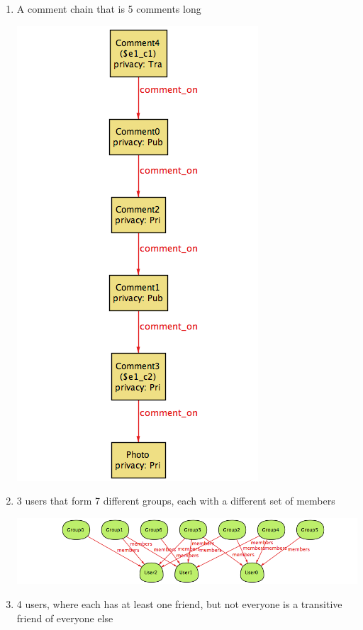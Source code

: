 \documentclass[pdftex,12pt,a4paper]{scrartcl}
\begin{document}
\begin{enumerate}
  \item A comment chain that is 5 comments long\\
  \begin{center}
  \includegraphics[scale=0.5]{e1.png}
  \end{center}
  \item 3 users that form 7 different groups, each with a different set of members
  \begin{center}
  \includegraphics[scale=0.5]{e2.png}
  \end{center}
  \item 4 users, where each has at least one friend, but not everyone is a transitive friend of everyone else
  \begin{center}

\end{center}
\end{enumerate}
\end{document}
